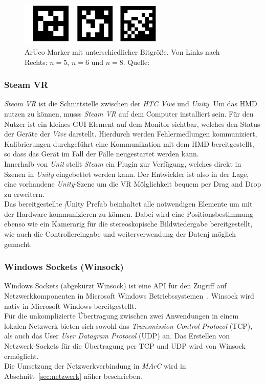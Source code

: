\begin{figure}[H] 
	\center 
	\includegraphics[width=7cm]{Bilder/VerschAruco.jpg}			
	\caption{ArUco Marker mit unterschiedlicher Bitgröße. Von Links nach Rechts: $n=5$, $n=6$ und $n=8$. Quelle: \cite{article:Aruco2014}}
	\label{fig:SizesArucoMarker}
\end{figure}

\subsubsection{Steam VR}
\textit{Steam VR} ist die Schnittstelle zwischen der \textit{HTC Vive} und \textit{Unity}. Um das HMD nutzen zu können, musss \textit{Steam VR} auf dem Computer installiert sein. Für den Nutzer ist ein kleines GUI Element auf dem Monitor sichtbar, welches den Status der Geräte der \textit{Vive} darstellt. Hierdurch werden Fehlermedlungen kommuniziert, Kalibrierungen durchgeführt eine Kommunikation mit dem HMD bereitgestellt, so dass das Gerät im Fall der Fälle neugestartet werden kann.\\
Innerhalb von \textit{Unit} stellt \textit{Steam} ein Plugin zur Verfügung, welches direkt in Szenen in \textit{Unity} eingebettet werden kann. Der Entwickler ist also in der Lage, eine vorhandene \textit{Unity}-Szene um die VR Mölglichkeit bequem per Drag and Drop zu erweitern.\\
Das bereitgestellte \textit|{Unity} Prefab beinhaltet alle notwendigen Elemente um mit der Hardware kommunizieren zu können. Dabei wird eine Positionsbestimmung ebenso wie ein Kamerarig für die stereoskopische Bildwiedergabe bereitgestellt, wie auch die Controllereingabe und weiterverwendung der Datenj möglich gemacht.


\subsubsection{Windows Sockets (Winsock)}\label{sec:Winsock}
Windows Sockets (abgekürzt Winsock) ist eine API für den Zugriff auf Netzwerkkomponenten in Microsoft Windows Betriebssystemen~\cite{quinn1998windows}. Winsock wird nativ in Microsoft Windows bereitgestellt.\\ 
Für die unkomplizierte Übertragung zwischen zwei Anwendungen in einem lokalen Netzwerk bieten sich sowohl das \emph{Transmission Control Protocol} (TCP), als auch das User \emph{User Datagram Protocol} (UDP) an. Das Erstellen von Netzwerk-Sockets für die Übertragung per TCP und UDP wird von Winsock ermöglicht.\\ Die Umsetzung der Netzwerkverbindung in \emph{MArC} wird in Abschnitt~\ref{sec:netzwerk} näher beschrieben.


